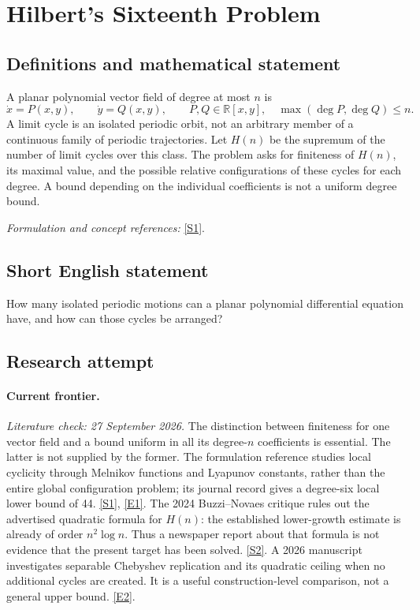 \documentclass[11pt,a4paper]{article}
\newcommand{\R}{\mathbb{R}}
\newcommand{\sref}[2]{\hyperlink{source:#1:#2}{[S#2]}}
\newcommand{\eref}[2]{\hyperlink{extra:#1:#2}{[E#2]}}
\newif\ifshowcatalogue
\newcommand{\cataloguescope}[1]{\ifshowcatalogue
 \paragraph{Exact scope in the supplied catalogue.}
 \begin{quote}\small #1\end{quote}\fi}
\numberwithin{equation}{section}
\begin{document}
\setcounter{section}{0}
\clearpage
\section*{\texorpdfstring{Hilbert's Sixteenth Problem}{Hilbert's Sixteenth Problem}}\label{1162}
\subsection{Definitions and mathematical statement}
A planar polynomial vector field of degree at most $n$ is
\[
 \dot x=P(x,y),\qquad\dot y=Q(x,y),\qquad P,Q\in\R[x,y],\quad\max(\deg P,\deg Q)\le n.
\]
A limit cycle is an isolated periodic orbit, not an arbitrary member of a continuous family of periodic trajectories. Let $H(n)$ be the supremum of the number of limit cycles over this class. The problem asks for finiteness of $H(n)$, its maximal value, and the possible relative configurations of these cycles for each degree. A bound depending on the individual coefficients is not a uniform degree bound.
\par\smallskip\textit{Formulation and concept references:} \sref{1162}{1}.
\cataloguescope{For every degree n >= 2, prove finiteness and determine the maximal number and possible configurations of limit cycles of planar polynomial vector fields of degree n.}
\subsection{Short English statement}
How many isolated periodic motions can a planar polynomial differential equation have, and how can those cycles be arranged?
\subsection{Research attempt}
\paragraph{Current frontier.}
\textit{Literature check: 27 September 2026.}
The distinction between finiteness for one vector field and a bound uniform
in all its degree-$n$ coefficients is essential. The latter is not supplied
by the former. The formulation reference studies local cyclicity through
Melnikov functions and Lyapunov constants, rather than the entire global
configuration problem; its journal record gives a degree-six local lower
bound of 44. \sref{1162}{1}, \eref{1162}{1}.
The 2024 Buzzi--Novaes critique rules out the advertised quadratic formula
for $H(n)$: the established lower-growth estimate is already of order
$n^2\log n$. Thus a newspaper report about that formula is not evidence
that the present target has been solved. \sref{1162}{2}.
A 2026 manuscript investigates separable Chebyshev replication and its
quadratic ceiling when no additional cycles are created. It is a useful
construction-level comparison, not a general upper bound. \eref{1162}{2}.
\end{document}
